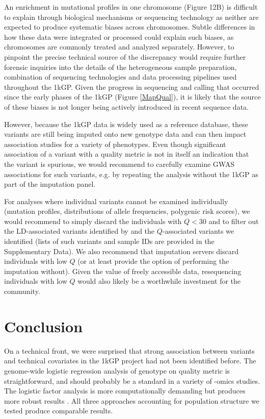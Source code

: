\documentclass[9pt,article]{template}
\begin{document}
An enrichment in mutational profiles in one chromosome (Figure 12B) is difficult to explain through biological mechanisms or sequencing technology as neither are expected to produce systematic biases across chromosomes. %
Subtle differences in how these data were integrated or processed could explain such biases, as chromosomes are commonly treated and analyzed separately. 
However, to pinpoint the precise technical source of the discrepancy would require further forensic inquiries into the details of the heterogeneous sample preparation, combination of sequencing technologies and data processing pipelines used throughout the 1kGP. 
Given the progress in sequencing and calling that occurred since the early phases of the 1kGP (Figure \ref{MapQual}), it is likely that the source of these biases is not longer being actively introduced in recent sequence data.

However, because the 1kGP data is widely used as a reference database, these variants are still being imputed onto new genotype data and can then impact association studies for a variety of phenotypes. 
Even though significant association of a variant with a quality metric is not in itself an indication that the variant is spurious, we would recommend to carefully examine GWAS associations for such variants, e.g. by repeating the analysis without the 1kGP as part of the imputation panel. 

For analyses where individual variants cannot be examined individually (mutation profiles, distributions of allele frequencies, polygenic risk scores), we would recommend to simply discard the individuals with $Q<30$ and to filter out the LD-associated variants identified by \cite{mafessoni2018turning} and the $Q$-associated variants we identified (lists of such variants and sample IDs are provided in the Supplementary Data). We also recommend that imputation servers discard individuals with low $Q$ (or at least provide the option of performing the imputation without). Given the value of freely accessible data, resequencing individuals with low $Q$ would  also likely be a worthwhile investment for the community. 

\section{Conclusion}

On a technical front, we were surprised that strong association between variants and technical covariates in the 1kGP project had not been identified before. 
The genome-wide logistic regression analysis of genotype on quality metric is straightforward, and should probably be a standard in a variety of -omics studies. 
The logistic factor analysis is more computationally demanding but produces more robust results \citep{song2015testing}. 
All three approaches accounting for population structure we tested produce comparable results.  
\end{document}
